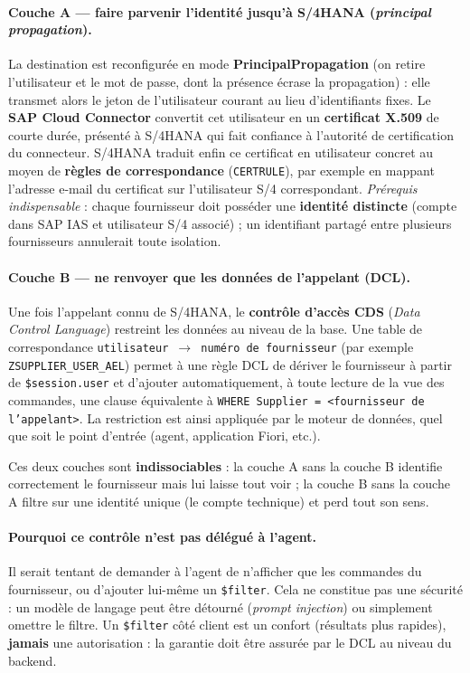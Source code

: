 \documentclass[12pt,a4paper,oneside]{report}
\begin{document}
\paragraph{Couche A --- faire parvenir l'identité jusqu'à S/4HANA (\textit{principal
propagation}).} La destination est reconfigurée en mode \textbf{PrincipalPropagation}
(on retire l'utilisateur et le mot de passe, dont la présence écrase la propagation) :
elle transmet alors le jeton de l'utilisateur courant au lieu d'identifiants fixes. Le
\textbf{SAP Cloud Connector} convertit cet utilisateur en un \textbf{certificat X.509} de
courte durée, présenté à S/4HANA qui fait confiance à l'autorité de certification du
connecteur. S/4HANA traduit enfin ce certificat en utilisateur concret au moyen de
\textbf{règles de correspondance} (\texttt{CERTRULE}), par exemple en mappant l'adresse
e-mail du certificat sur l'utilisateur S/4 correspondant. \emph{Prérequis indispensable} :
chaque fournisseur doit posséder une \textbf{identité distincte} (compte dans SAP IAS et
utilisateur S/4 associé) ; un identifiant partagé entre plusieurs fournisseurs annulerait
toute isolation.

\paragraph{Couche B --- ne renvoyer que les données de l'appelant (DCL).} Une fois
l'appelant connu de S/4HANA, le \textbf{contrôle d'accès CDS} (\textit{Data Control
Language}) restreint les données au niveau de la base. Une table de correspondance
\texttt{utilisateur $\rightarrow$ numéro de fournisseur} (par exemple
\texttt{ZSUPPLIER\_USER\_AEL}) permet à une règle DCL de dériver le fournisseur à partir de
\texttt{\$session.user} et d'ajouter automatiquement, à toute lecture de la vue des
commandes, une clause équivalente à \texttt{WHERE Supplier = <fournisseur de l'appelant>}.
La restriction est ainsi appliquée par le moteur de données, quel que soit le point
d'entrée (agent, application Fiori, etc.).

Ces deux couches sont \textbf{indissociables} : la couche A sans la couche B identifie
correctement le fournisseur mais lui laisse tout voir ; la couche B sans la couche A
filtre sur une identité unique (le compte technique) et perd tout son sens.

\paragraph{Pourquoi ce contrôle n'est pas délégué à l'agent.} Il serait tentant de
demander à l'agent de n'afficher que les commandes du fournisseur, ou d'ajouter lui-même
un \texttt{\$filter}. Cela ne constitue pas une sécurité : un modèle de langage peut être
détourné (\textit{prompt injection}) ou simplement omettre le filtre. Un \texttt{\$filter}
côté client est un confort (résultats plus rapides), \textbf{jamais} une autorisation : la
garantie doit être assurée par le DCL au niveau du backend.
\end{document}
